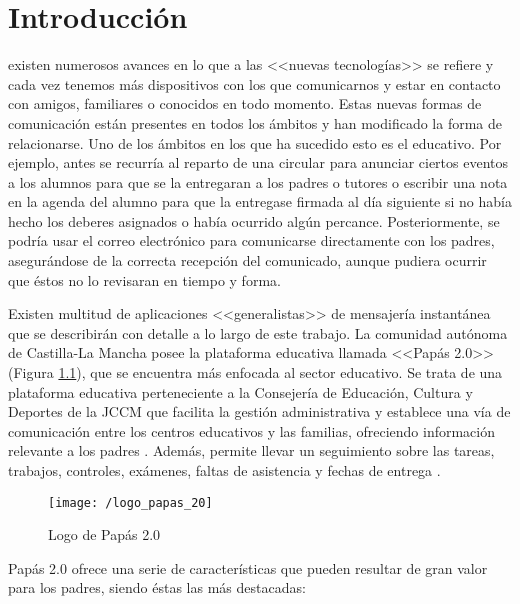 \chapter{Introducción}
\label{chap:intro}

 existen numerosos avances en lo que a las <<nuevas tecnologías>> se refiere y cada vez tenemos más dispositivos con los que comunicarnos y estar en contacto con amigos, familiares o conocidos en todo momento. Estas nuevas formas de comunicación están presentes en todos los ámbitos y han modificado la forma de relacionarse. Uno de los ámbitos en los que ha sucedido esto es el educativo. Por ejemplo, antes se recurría al reparto de una circular para anunciar ciertos eventos a los alumnos para que se la entregaran a los padres o tutores o escribir una nota en la agenda del alumno para que la entregase firmada al día siguiente si no había hecho los deberes asignados o había ocurrido algún percance. Posteriormente, se podría usar el correo electrónico para comunicarse directamente con los padres, asegurándose de la correcta recepción del comunicado, aunque pudiera ocurrir que éstos no lo revisaran en tiempo y forma.

Existen multitud de aplicaciones <<generalistas>> de mensajería instantánea que se describirán con detalle a lo largo de este trabajo. La comunidad autónoma de Castilla-La Mancha posee la plataforma educativa llamada <<Papás 2.0>> (Figura \ref{fig:papas20}), que se encuentra más enfocada al sector educativo. Se trata de una plataforma educativa perteneciente a la Consejería de Educación, Cultura y Deportes de la \acf{JCCM} que facilita la gestión administrativa y establece una vía de comunicación entre los centros educativos y las familias, ofreciendo información relevante a los padres \cite{JCCM2017}. Además, permite llevar un seguimiento sobre las tareas, trabajos, controles, exámenes, faltas de asistencia y fechas de entrega \cite{JCCM2010}.

\begin{figure}[!h]
	\begin{center}
		\texttt{[image: /logo\_papas\_20]}
		\caption{Logo de Papás 2.0}
		\label{fig:papas20}
	\end{center}
\end{figure}

\newpage

Papás 2.0 ofrece una serie de características que pueden resultar de gran valor para los padres, siendo éstas las más destacadas:


